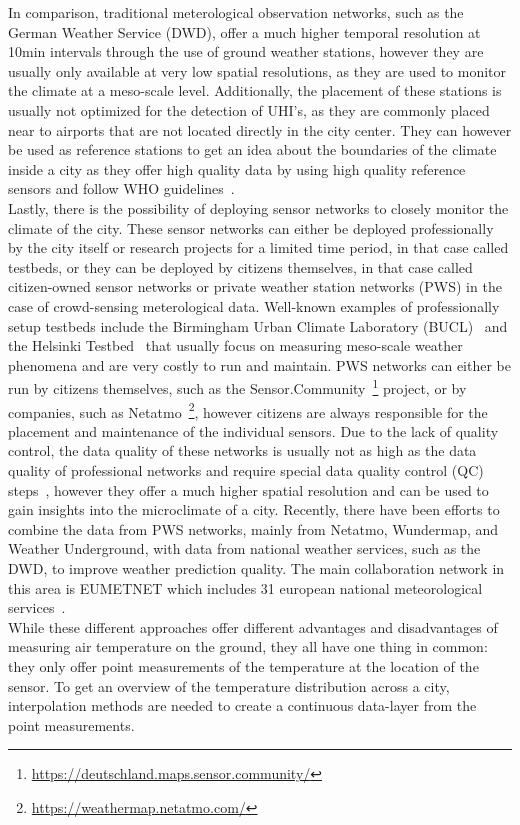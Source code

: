 In comparison, traditional meterological observation networks, such as the German Weather Service (DWD), offer a much higher temporal resolution at 10min intervals through the use of ground weather stations, however they are usually only available at very low spatial resolutions, as they are used to monitor the climate at a meso-scale level. Additionally, the placement of these stations is usually not optimized for the detection of UHI's, as they are commonly placed near to airports that are not located directly in the city center. They can however be used as reference stations to get an idea about the boundaries of the climate inside a city as they offer high quality data by using high quality reference sensors and follow WHO guidelines~\cite{oke2006guideline}.\\
Lastly, there is the possibility of deploying sensor networks to closely monitor the climate of the city. These sensor networks can either be deployed professionally by the city itself or research projects for a limited time period, in that case called testbeds, or they can be deployed by citizens themselves, in that case called citizen-owned sensor networks or private weather station networks (PWS) in the case of crowd-sensing meterological data. Well-known examples of professionally setup testbeds include the Birmingham Urban Climate Laboratory (BUCL)~\cite{chapman2015birmingham} and the Helsinki Testbed~\cite{koskinen2011helsinki} that usually focus on measuring meso-scale weather phenomena and are very costly to run and maintain.
PWS networks can either be run by citizens themselves, such as the Sensor.Community~\footnote{\url{https://deutschland.maps.sensor.community/}} project, or by companies, such as Netatmo~\footnote{\url{https://weathermap.netatmo.com/}}, however citizens are always responsible for the placement and maintenance of the individual sensors. Due to the lack of quality control, the data quality of these networks is usually not as high as the data quality of professional networks and require special data quality control (QC) steps~\cite{fenner2021crowdqc+, meier2017crowdsourcing}, however they offer a much higher spatial resolution and can be used to gain insights into the microclimate of a city. Recently, there have been efforts to combine the data from PWS networks, mainly from Netatmo, Wundermap, and Weather Underground, with data from national weather services, such as the DWD, to improve weather prediction quality. The main collaboration network in this area is EUMETNET which includes 31 european national meteorological services~\cite{hahn2022observations}.\\
While these different approaches offer different advantages and disadvantages of measuring air temperature on the ground, they all have one thing in common: they only offer point measurements of the temperature at the location of the sensor. To get an overview of the temperature distribution across a city, interpolation methods are needed to create a continuous data-layer from the point measurements.

